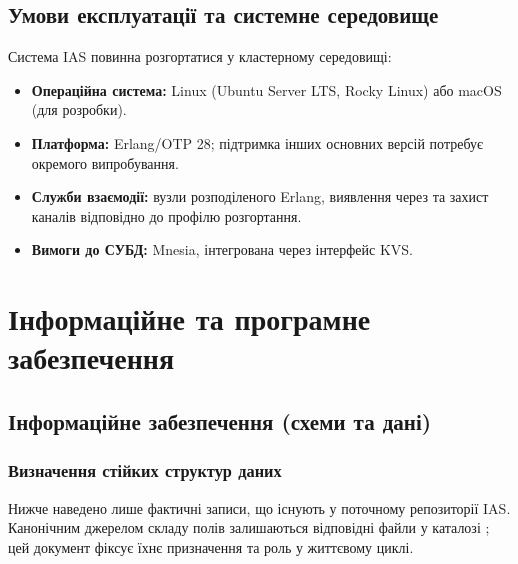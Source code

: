 \documentclass{article}
\begin{document}
\subsection{Умови експлуатації та системне середовище}
Система IAS повинна розгортатися у кластерному середовищі:
\begin{itemize}
    \item \textbf{Операційна система:} Linux (Ubuntu Server LTS, Rocky Linux) або macOS (для розробки).
    \item \textbf{Платформа:} Erlang/OTP 28; підтримка інших основних версій потребує окремого випробування.
    \item \textbf{Служби взаємодії:} вузли розподіленого Erlang, виявлення через  та захист каналів відповідно до профілю розгортання.
    \item \textbf{Вимоги до СУБД:} Mnesia, інтегрована через інтерфейс KVS.
\end{itemize}

\newpage
\section{Інформаційне та програмне забезпечення}

\subsection{Інформаційне забезпечення (схеми та дані)}

\subsubsection{Визначення стійких структур даних}
Нижче наведено лише фактичні записи, що існують у поточному репозиторії IAS. Канонічним джерелом складу полів залишаються відповідні файли у каталозі ; цей документ фіксує їхнє призначення та роль у життєвому циклі.
\end{document}
